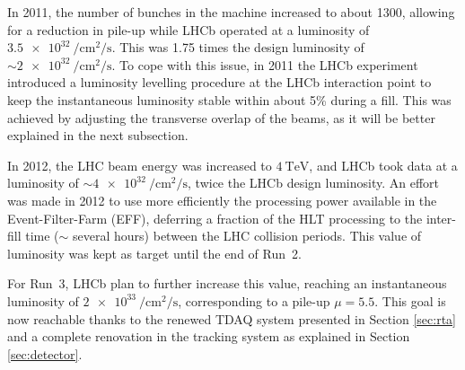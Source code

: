 
In 2011, the number of bunches in the machine increased to about 1300, allowing for a reduction in pile-up while LHCb operated at a luminosity of $\SI{3.5e32}{\per\centi\meter\squared\per\second}$. This was 1.75 times the design luminosity of $\sim \SI{2e32}{\per\centi\meter\squared\per\second}$. %
To cope with this issue, in 2011 the LHCb experiment introduced a luminosity levelling procedure at the LHCb interaction point to keep the instantaneous luminosity stable within about 5\% during a fill. This was achieved by adjusting the transverse overlap of the beams, as it will be better explained in the next subsection.

In 2012, the LHC beam energy was increased to $\SI{4}{\tera\eV}$, and LHCb took data at a luminosity of $\sim \SI{4e32}{\per\centi\meter\squared\per\second}$, twice the LHCb design luminosity. An effort was made in 2012 to use more efficiently the processing power available in the Event-Filter-Farm (EFF), deferring a fraction of the HLT processing to the inter-fill time ($\sim$ several hours) between the LHC collision periods. This value of luminosity was kept as target until the end of Run~2.  


For Run~3, LHCb plan to further increase this value, reaching an instantaneous luminosity of $\SI{2e33}{\per\centi\meter\squared\per\second}$, corresponding to a pile-up $\mu=5.5$.
This goal is now reachable thanks to the renewed TDAQ system presented in Section \ref{sec:rta} and a complete renovation in the tracking system as explained in Section \ref{sec:detector}. 


